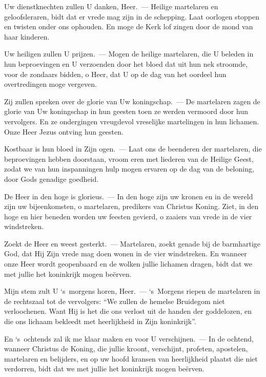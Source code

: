 \documentclass[12pt,twoside,a5paper]{article}
\begin{document}

\begin{halfparskip}
  Uw dienstknechten zullen U danken, Heer.~--- Heilige martelaren en geloofsleraren, bidt dat er vrede mag zijn in de schepping. Laat oorlogen stoppen en twisten onder ons ophouden. En moge de Kerk lof zingen door de mond van haar kinderen.

  Uw heiligen zullen U prijzen.~--- Mogen de heilige martelaren, die U beleden in hun beproevingen en U verzoenden door het bloed dat uit hun nek stroomde, voor de zondaars bidden, o Heer, dat U op de dag van het oordeel hun overtredingen moge vergeven.

  Zij zullen spreken over de glorie van Uw koningschap.~--- De martelaren zagen de glorie van Uw koningschap in hun geesten toen ze werden vermoord door hun vervolgers. En ze ondergingen vreugdevol vreselijke martelingen in hun lichamen. Onze Heer Jezus ontving hun geesten.

  Kostbaar is hun bloed in Zijn ogen.~--- Laat ons de beenderen der martelaren, die beproevingen hebben doorstaan, vroom eren met liederen van de Heilige Geest, zodat we van hun inspanningen hulp mogen ervaren op de dag van de beloning, door Gods genadige goedheid.

  De Heer in den hoge is glorieus.~--- In den hoge zijn uw kronen en in de wereld zijn uw bijeenkomsten, o martelaren, predikers van Christus Koning. Ziet, in den hoge en hier beneden worden uw feesten gevierd, o zaaiers van vrede in de vier windstreken.

  Zoekt de Heer en weest gesterkt.~--- Martelaren, zoekt genade bij de barmhartige God, dat Hij Zijn vrede mag doen wonen in de vier windstreken. En wanneer onze Heer wordt geopenbaard en de wolken jullie lichamen dragen, bidt dat we met jullie het koninkrijk mogen beërven.

  Mijn stem zult U `s~morgens horen, Heer.~--- `s~Morgens riepen de martelaren in de rechtszaal tot de vervolgers: ``We zullen de hemelse Bruidegom niet verloochenen. Want Hij is het die ons verlost uit de handen der goddelozen, en die ons lichaam bekleedt met heerlijkheid in Zijn koninkrijk''.

  En `s~ochtends zal ik me klaar maken en voor U verschijnen.~--- In de ochtend, wanneer Christus de Koning, die jullie kroont, verschijnt, profeten, apostelen, martelaren en belijders, en op uw hoofd kransen van heerlijkheid plaatst die niet verdorren, bidt dat we met jullie het koninkrijk mogen beërven.


\end{halfparskip}
\end{document}
